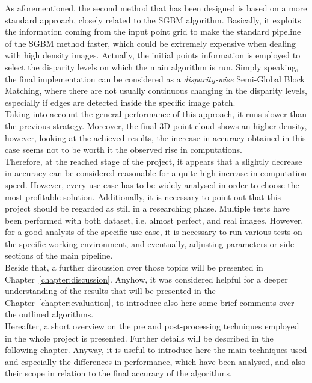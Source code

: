 As aforementioned, the second method that has been designed is based on a more standard approach, closely related to the SGBM algorithm. 
Basically, it exploits the information coming from the input point grid to make the standard pipeline of the SGBM method faster, which could be extremely expensive when dealing with high density images.
Actually, the initial points information is employed to select the disparity levels on which the main algorithm is run. 
Simply speaking, the final implementation can be considered as a \textit{disparity-wise} Semi-Global Block Matching, where there are not usually continuous changing in the disparity levels, especially if edges are detected inside the specific image patch.\\
Taking into account the general performance of this approach, it runs slower than the previous strategy. 
Moreover, the final 3D point cloud shows an higher density, however, looking at the achieved results, the increase in accuracy obtained in this case seems not to be worth it the observed rise in computations. \\
Therefore, at the reached stage of the project, it appears that a slightly decrease in accuracy can be considered reasonable for a quite high increase in computation speed. 
However, every use case has to be widely analysed in order to choose the most profitable solution.
Additionally, it is necessary to point out that this project should be regarded as still in a researching phase. 
Multiple tests have been performed with both dataset, i.e. almost perfect, and real images. 
However, for a good analysis of the specific use case, it is necessary to run various tests on the specific working environment, and eventually, adjusting parameters or side sections of the main pipeline.\\
Beside that, a further discussion over those topics will be presented in Chapter~\ref{chapter:discussion}. 
Anyhow, it was considered helpful for a deeper understanding of the results that will be presented in the Chapter~\ref{chapter:evaluation}, to introduce also here some brief comments over the outlined algorithms.\\
Hereafter, a short overview on the pre and post-processing techniques employed in the whole project is presented. 
Further details will be described in the following chapter. 
Anyway, it is useful to introduce here the main techniques used and especially the differences in performance, which have been analysed, and also their scope in relation to the final accuracy of the algorithms.

